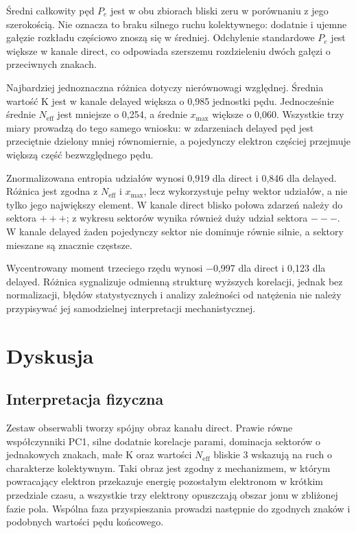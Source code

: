 \documentclass[12pt,letterpaper,oneside]{report}
\numberwithin{equation}{chapter}
\numberwithin{figure}{chapter}
\numberwithin{table}{chapter}
\newcommand{\Pe}{\ensuremath{P_e}}
\newcommand{\Neff}{\ensuremath{N_{\mathrm{eff}}}}
\newcommand{\xmax}{\ensuremath{x_{\max}}}
\begin{document}
Średni całkowity pęd \Pe{} jest w obu zbiorach bliski zeru w porównaniu z
jego szerokością. Nie oznacza to braku silnego ruchu kolektywnego:
dodatnie i ujemne gałęzie rozkładu częściowo znoszą się w średniej.
Odchylenie standardowe \Pe{} jest większe w kanale direct, co odpowiada
szerszemu rozdzieleniu dwóch gałęzi o przeciwnych znakach.

Najbardziej jednoznaczna różnica dotyczy nierównowagi względnej. Średnia
wartość K jest w kanale delayed większa o 0,985 jednostki pędu.
Jednocześnie średnie \Neff{} jest mniejsze o 0,254, a średnie \xmax{}
większe o 0,060. Wszystkie trzy miary prowadzą do tego samego wniosku: w
zdarzeniach delayed pęd jest przeciętnie dzielony mniej równomiernie, a
pojedynczy elektron częściej przejmuje większą część bezwzględnego pędu.

Znormalizowana entropia udziałów wynosi 0,919 dla direct i 0,846 dla
delayed. Różnica jest zgodna z \Neff{} i \xmax{}, lecz wykorzystuje pełny
wektor udziałów, a nie tylko jego największy element. W kanale direct
blisko połowa zdarzeń należy do sektora \ensuremath{+++}; z wykresu sektorów wynika
również duży udział sektora \ensuremath{---}. W kanale delayed żaden pojedynczy
sektor nie dominuje równie silnie, a sektory mieszane są znacznie
częstsze.

Wycentrowany moment trzeciego rzędu wynosi \ensuremath{-}0,997 dla direct i 0,123 dla
delayed. Różnica sygnalizuje odmienną strukturę wyższych korelacji,
jednak bez normalizacji, błędów statystycznych i analizy zależności od
natężenia nie należy przypisywać jej samodzielnej interpretacji
mechanistycznej.

\chapter{Dyskusja}
\section{Interpretacja fizyczna}

Zestaw obserwabli tworzy spójny obraz kanału direct. Prawie równe
współczynniki PC1, silne dodatnie korelacje parami, dominacja sektorów o
jednakowych znakach, małe K oraz wartości \Neff{} bliskie 3 wskazują na
ruch o charakterze kolektywnym. Taki obraz jest zgodny z mechanizmem, w
którym powracający elektron przekazuje energię pozostałym elektronom w
krótkim przedziale czasu, a wszystkie trzy elektrony opuszczają obszar
jonu w zbliżonej fazie pola. Wspólna faza przyspieszania prowadzi
następnie do zgodnych znaków i podobnych wartości pędu końcowego.
\end{document}
